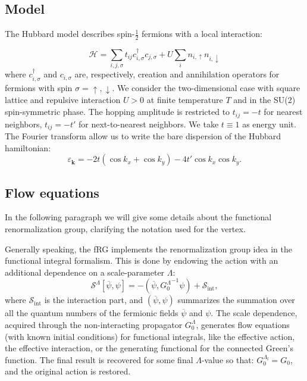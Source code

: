 
\subsection{Model}

The Hubbard model\cite{Hubbard1963} describes spin-$\frac{1}{2}$ fermions with a local interaction:

\begin{equation}
\mathcal{H} = \sum_{i,j,\sigma} t_{ij} c^{\dagger}_{i,\sigma} c_{j,\sigma} + U \sum_{i} n_{i,\uparrow} n_{i,\downarrow}
\end{equation}
where $c^{\dagger}_{i,\sigma}$ and $c_{i,\sigma}$ are, respectively, creation and annihilation operators 
for fermions with spin $\sigma=\uparrow,\downarrow$. We consider the two-dimensional case with square lattice and repulsive interaction $U>0$ at finite temperature $T$ and in the SU(2) spin-symmetric phase. The hopping amplitude is restricted to $t_{ij} = -t$ for nearest neighbors, $t_{ij}=-t'$ for next-to-nearest neighbors. We take $t\equiv1$ as energy unit. 
The Fourier transform allow us to write the bare dispersion of the Hubbard hamiltonian:
\begin{equation}
\varepsilon_{\mathbf{k}} = -2t \left( \cos{k_x} + \cos{k_y} \right) -4 t' \cos{k_x} \cos{k_y}.
\end{equation}


\subsection{Flow equations}


In the following paragraph we will give some details about the functional renormalization group,\cite{Metzner2012,Platt2013} clarifying the notation used for the vertex. 

Generally speaking, the fRG implements the renormalization group idea in the functional integral formalism. 
This is done by endowing the action with an additional dependence on a scale-parameter $\Lambda$:\cite{Metzner2012,Platt2013} 
\begin{equation}
 \mathcal{S}^\Lambda[\overline\psi,\psi]=
-(\overline\psi,{G_0^\Lambda}^{-1}\psi)+\mathcal{S}_{\mathrm{int}},  
\end{equation} 
where $\mathcal{S}_{\mathrm{int}}$ is the interaction part, and $(\overline\psi,\psi)$ summarizes the summation over all the quantum numbers of the fermionic fields  $\overline \psi$ and $\psi$. 
The scale dependence, acquired through the non-interacting propagator $G_0^\Lambda$, generates flow equations (with known initial conditions) for functional integrals,\cite{Wetterich1993} like the effective action, the effective interaction, or the generating functional for the connected Green's function. 
The final result is recovered for some final $\Lambda$-value so that: $G_0^{\Lambda_\mathrm{f}} = G_0$, and the original action is restored.  

